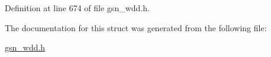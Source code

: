 Definition at line 674 of file gsn\_\-wdd.h.



The documentation for this struct was generated from the following file:\begin{DoxyCompactItemize}
\item 
\hyperlink{a00603}{gsn\_\-wdd.h}\end{DoxyCompactItemize}
